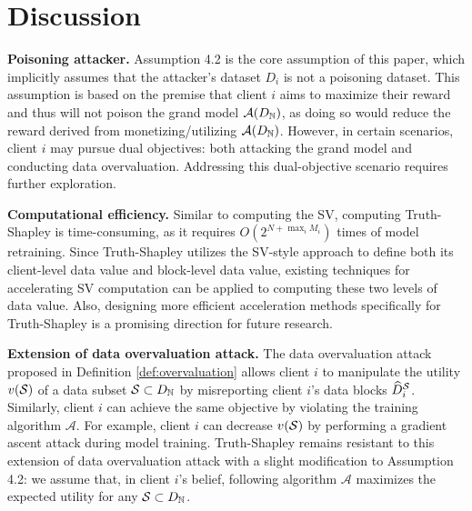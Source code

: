 \section{Discussion}
\label{sec:discuss}
\textbf{Poisoning attacker.}
Assumption 4.2 is the core assumption of this paper, which implicitly assumes that the attacker's dataset $D_i$ is not a poisoning dataset. This assumption is based on the premise that client $i$ aims to maximize their reward and thus will not poison the grand model $\mathcal{A}(D_{\mathbb{N}})$, as doing so would reduce the reward derived from monetizing/utilizing $\mathcal{A}(D_{\mathbb{N}})$.
However, in certain scenarios, client $i$ may pursue dual objectives: both attacking the grand model and conducting data overvaluation. Addressing this dual-objective scenario requires further exploration.


\textbf{Computational efficiency.}
Similar to computing the SV, computing Truth-Shapley is time-consuming, as it requires $O(2^{N+\max_i M_i})$ times of model retraining. 
Since Truth-Shapley utilizes the SV-style approach to define both its client-level data value and block-level data value, existing techniques for accelerating SV computation can be applied to computing these two levels of data value.
Also, designing more efficient acceleration methods specifically for Truth-Shapley is a promising direction for future research.


\textbf{Extension of data overvaluation attack.}
The data overvaluation attack proposed in Definition \ref{def:overvaluation} allows client $i$ to manipulate the utility $v(\mathcal{S})$ of a data subset $\mathcal{S} \subset D_{\mathbb{N}}$ by misreporting client $i$'s data blocks $\widehat{D}^{\mathcal{S}}_{i}$. 
Similarly, client $i$ can achieve the same objective by violating the training algorithm $\mathcal{A}$.
For example, client $i$ can decrease $v(\mathcal{S})$ by performing a gradient ascent attack during model training.
Truth-Shapley remains resistant to this extension of data overvaluation attack with a slight modification to Assumption 4.2: we assume that, in client $i$’s belief, following algorithm $\mathcal{A}$ maximizes the expected utility for any $\mathcal{S} \subset D_{\mathbb{N}}$.